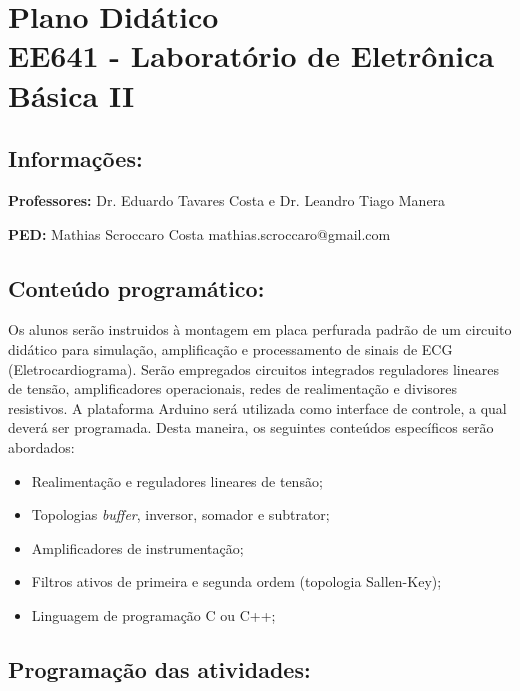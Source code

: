 \documentclass{article}[12pt]
\begin{document}
\newpage

\normalsize

\section*{Plano Didático\\EE641 - Laboratório de Eletrônica Básica II}

\subsection*{Informações:}

\textbf{Professores:} Dr. Eduardo Tavares Costa e Dr. Leandro Tiago Manera

\textbf{PED:} Mathias Scroccaro Costa \hfill mathias.scroccaro@gmail.com

\subsection*{Conteúdo programático:}

Os alunos serão instruidos à montagem em placa perfurada padrão de um circuito didático para simulação, amplificação e processamento de sinais de ECG (Eletrocardiograma). Serão empregados circuitos integrados reguladores lineares de tensão, amplificadores operacionais, redes de realimentação e divisores resistivos. A plataforma Arduino será utilizada como interface de controle, a qual deverá ser programada. Desta maneira, os seguintes conteúdos específicos serão abordados:

\begin{itemize}
\item Realimentação e reguladores lineares de tensão;
\item Topologias \textit{buffer}, inversor, somador e subtrator; 
\item Amplificadores de instrumentação;
\item Filtros ativos de primeira e segunda ordem (topologia Sallen-Key);
\item Linguagem de programação C ou C++;
\end{itemize}

\subsection*{Programação das atividades:}
\end{document}
